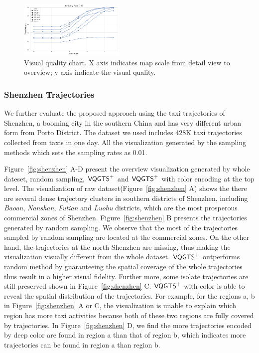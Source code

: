 \begin{figure}[t]
	\centering
	\vspace{2mm}
	\includegraphics[width=0.45\textwidth]{pictures/experiment_study/quanlity.png}
	\caption{Visual quality chart. X axis indicates map scale from detail view to overview; y axis indicate the visual quality. }
	\vspace{0mm}
	\label{fig:quality_chart}
\end{figure}


\subsubsection{Shenzhen Trajectories}
We further evaluate the proposed approach using the taxi trajectories of Shenzhen, a booming city in the southern China and has very different urban form from Porto District. The dataset we used includes 428K taxi trajectories collected from \QM{**} taxis in one day. All the visualization generated by the sampling methods which sets the sampling rates as 0.01.
 
Figure~\ref{fig:shenzhen} A-D present the overview visualization generated by whole dateset, random sampling, $\mathsf{VQGTS}^{+}$ and $\mathsf{VQGTS}^{+}$ with color encoding at the top level. The visualization of raw dataset(Figure~\ref{fig:shenzhen} A) shows the there are several dense trajectory clusters in southern districts of Shenzhen, including \textit{Baoan}, \textit{Nanshan}, \textit{Futian} and \textit{Luohu} districts, which are the most prosperous commercial zones of Shenzhen. Figure~\ref{fig:shenzhen} B presents the trajectories generated by random sampling. We observe that the most of the trajectories sampled by random sampling are located at the commercial zones. On the other hand, the trajectories at the north Shenzhen are missing, thus making the visualization visually different from the whole dataset.
$\mathsf{VQGTS}^{+}$ outperforms random method by guaranteeing the spatial coverage of the whole trajectories thus result in a higher visual fidelity. Further more, some isolate trajectories are still preserved shown in Figure~\ref{fig:shenzhen} C. $\mathsf{VQGTS}^{+}$ with color is able to reveal the spatial distribution of the trajectories. For example, for the regions a, b in Figure~\ref{fig:shenzhen} A or C, the visualization is unable to explain which region has more taxi activities because both of these two regions are fully covered by trajectories. In Figure~\ref{fig:shenzhen} D, we find the more trajectories encoded by deep color are found in region a than that of region b, which indicates more trajectories can be found in region a than region b. 

